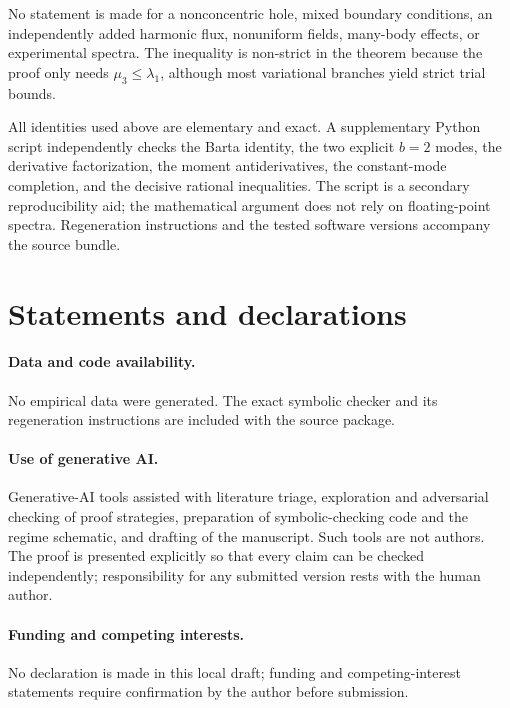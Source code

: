 \documentclass[11pt]{article}
\begin{document}
No statement is made for a nonconcentric hole, mixed boundary conditions,
an independently added harmonic flux, nonuniform fields, many-body effects,
or experimental spectra.  The inequality is non-strict in the theorem
because the proof only needs $\mu_3\leq\lambda_1$, although most variational
branches yield strict trial bounds.

All identities used above are elementary and exact.  A supplementary Python
script independently checks the Barta identity, the two explicit $b=2$
modes, the derivative factorization, the moment antiderivatives, the
constant-mode completion, and the decisive rational inequalities.  The
script is a secondary reproducibility aid; the mathematical argument does
not rely on floating-point spectra.  Regeneration instructions and the
tested software versions accompany the source bundle.

\section*{Statements and declarations}

\paragraph{Data and code availability.}
No empirical data were generated.  The exact symbolic checker and its
regeneration instructions are included with the source package.

\paragraph{Use of generative AI.}
Generative-AI tools assisted with literature triage, exploration and
adversarial checking of proof strategies, preparation of symbolic-checking
code and the regime schematic, and drafting of the manuscript.  Such tools
are not authors.  The proof is presented explicitly so that every claim can
be checked independently; responsibility for any submitted version rests
with the human author.

\paragraph{Funding and competing interests.}
No declaration is made in this local draft; funding and competing-interest
statements require confirmation by the author before submission.



\end{document}
